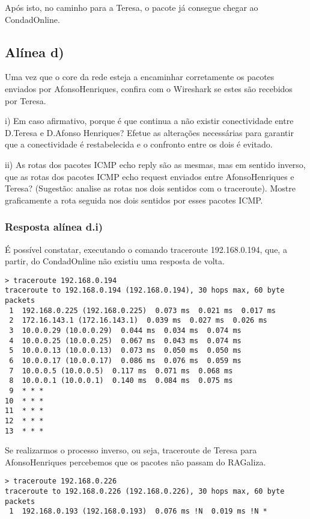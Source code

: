 \documentclass{article}
\begin{document}
Após isto, no caminho para a Teresa, o pacote já consegue chegar ao CondadOnline.

\subsection{Alínea d)}

Uma vez que o core da rede esteja a encaminhar corretamente os pacotes enviados por AfonsoHenriques,
confira com o Wireshark se estes são recebidos por Teresa.
\bigskip

i) Em caso afirmativo, porque é que continua a não existir conectividade entre D.Teresa e D.Afonso
Henriques? Efetue as alterações necessárias para garantir que a conectividade é restabelecida e o confronto
entre os dois é evitado.

ii) As rotas dos pacotes ICMP echo reply são as mesmas, mas em sentido inverso, que as rotas dos pacotes
ICMP echo request enviados entre AfonsoHenriques e Teresa? (Sugestão: analise as rotas nos dois sentidos
com o traceroute). Mostre graficamente a rota seguida nos dois sentidos por esses pacotes ICMP.

\subsubsection{Resposta alínea d.i)}
É possível constatar, executando o comando traceroute 192.168.0.194, que, a partir, do CondadOnline não existiu uma resposta de volta.
\begin{lstlisting}
> traceroute 192.168.0.194                  
traceroute to 192.168.0.194 (192.168.0.194), 30 hops max, 60 byte packets
 1  192.168.0.225 (192.168.0.225)  0.073 ms  0.021 ms  0.017 ms
 2  172.16.143.1 (172.16.143.1)  0.039 ms  0.027 ms  0.026 ms
 3  10.0.0.29 (10.0.0.29)  0.044 ms  0.034 ms  0.074 ms
 4  10.0.0.25 (10.0.0.25)  0.067 ms  0.043 ms  0.074 ms
 5  10.0.0.13 (10.0.0.13)  0.073 ms  0.050 ms  0.050 ms
 6  10.0.0.17 (10.0.0.17)  0.086 ms  0.076 ms  0.059 ms
 7  10.0.0.5 (10.0.0.5)  0.117 ms  0.071 ms  0.068 ms
 8  10.0.0.1 (10.0.0.1)  0.140 ms  0.084 ms  0.075 ms
 9  * * *
10  * * *
11  * * *
12  * * *
13  * * *
\end{lstlisting}

Se realizarmos o processo inverso, ou seja, traceroute de Teresa para AfonsoHenriques percebemos que os pacotes não passam do RAGaliza.

\begin{lstlisting}
> traceroute 192.168.0.226
traceroute to 192.168.0.226 (192.168.0.226), 30 hops max, 60 byte packets
 1  192.168.0.193 (192.168.0.193)  0.076 ms !N  0.019 ms !N *
\end{lstlisting}
\end{document}

